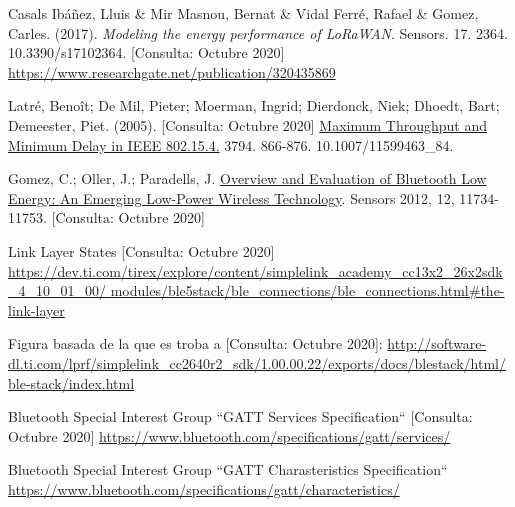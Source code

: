 \begin{thebibliography}{2}
Casals Ibáñez, Lluis \& Mir Masnou, Bernat \& Vidal Ferré, Rafael \& Gomez, Carles. (2017). \textit{Modeling the energy performance of LoRaWAN}. Sensors. 17. 2364. 10.3390/s17102364. 
[Consulta: Octubre 2020] \newline
\href{https://www.researchgate.net/publication/320435869}{https://www.researchgate.net/publication/320435869}

Latré, Benoît; De Mil, Pieter; Moerman, Ingrid; Dierdonck, Niek; Dhoedt, Bart; Demeester, Piet. (2005).
[Consulta: Octubre 2020] \href{https://www.researchgate.net/publication/220963645_Maximum_Throughput_and_Minimum_Delay_in_IEEE_802154}{Maximum Throughput and Minimum Delay in IEEE 802.15.4.} 3794. 866-876. 10.1007/11599463\_84.

Gomez, C.; Oller, J.; Paradells, J.  \href{https://www.mdpi.com/1424-8220/12/9/11734}{Overview and Evaluation of Bluetooth Low Energy: An Emerging Low-Power Wireless Technology}. Sensors 2012, 12, 11734-11753.
[Consulta: Octubre 2020]

Link Layer States [Consulta: Octubre 2020]\newline
\href{https://dev.ti.com/tirex/explore/content/simplelink_academy_cc13x2_26x2sdk_4_10_01_00/modules/ble5stack/ble_connections/ble_connections.html\#the-link-layer}{https://dev.ti.com/tirex/explore/content/simplelink\_academy\_cc13x2\_26x2sdk\_4\_10\_01\_00/ modules/ble5stack/ble\_connections/ble\_connections.html\#the-link-layer}

Figura basada de la que es troba a [Consulta: Octubre 2020]:\newline
\href{http://software-dl.ti.com/lprf/simplelink_cc2640r2_sdk/1.00.00.22/exports/docs/blestack/html/ble-stack/index.html}{http://software-dl.ti.com/lprf/simplelink\_cc2640r2\_sdk/1.00.00.22/exports/docs/blestack/html/ble-stack/index.html}

Bluetooth Special Interest Group
``GATT Services Specification``
[Consulta: Octubre 2020]\newline
\href{https://www.bluetooth.com/specifications/gatt/services/}{https://www.bluetooth.com/specifications/gatt/services/}

Bluetooth Special Interest Group ``GATT Charasteristics Specification``\newline
\href{https://www.bluetooth.com/specifications/gatt/characteristics/}{https://www.bluetooth.com/specifications/gatt/characteristics/}


\end{thebibliography}
